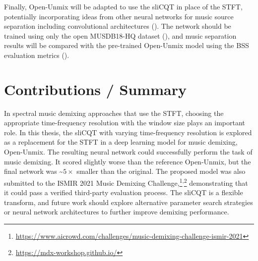 \documentclass[letter,12pt]{article}
\begin{document}
Finally, Open-Unmix will be adapted to use the sliCQT in place of the STFT, potentially incorporating ideas from other neural networks for music source separation including convolutional architectures (\cite{plumbley2}). The network should be trained using only the open MUSDB18-HQ dataset (\cite{musdb18hq}), and music separation results will be compared with the pre-trained Open-Unmix model using the BSS evaluation metrics (\cite{bss, sisec2018}).

\section{Contributions / Summary}

In spectral music demixing approaches that use the STFT, choosing the appropriate time-frequency resolution with the window size plays an important role. In this thesis, the sliCQT with varying time-frequency resolution is explored as a replacement for the STFT in a deep learning model for music demixing, Open-Unmix. The resulting neural network could successfully perform the task of music demixing. It scored slightly worse than the reference Open-Unmix, but the final network was \textasciitilde$5 \times$ smaller than the original. The proposed model was also submitted to the ISMIR 2021 Music Demixing Challenge,\footnote{\url{https://www.aicrowd.com/challenges/music-demixing-challenge-ismir-2021}}\textsuperscript{,}\footnote{\url{https://mdx-workshop.github.io/}} demonstrating that it could pass a verified third-party evaluation process. The sliCQT is a flexible transform, and future work should explore alternative parameter search strategies or neural network architectures to further improve demixing performance. 

\vfill
\clearpage %

\printbibheading[title={References},heading=bibnumbered]
\printbibliography[heading=none]

\vfill
\clearpage %
\end{document}
